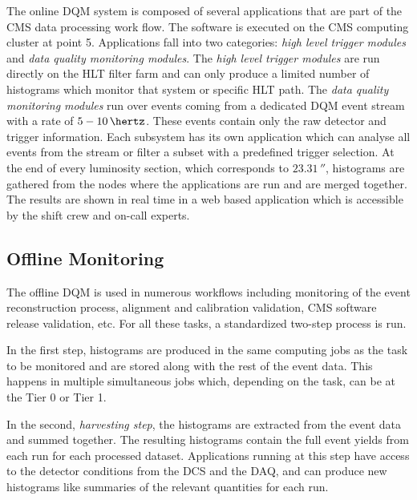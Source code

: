 
The online \gls{DQM} system is composed of several applications that are part of the \gls{CMS} data processing work flow. The software is executed on the \gls{CMS} computing cluster at point 5. Applications fall into two categories: \textit{high level trigger modules} and \textit{data quality monitoring modules}. The \textit{high level trigger modules} are run directly on the \gls{HLT} filter farm and can only produce a limited number of histograms which monitor that system or specific \gls{HLT} path. The \textit{data quality monitoring modules} run over events coming from a dedicated \gls{DQM} event stream with a rate of $5-10\,\hertz$. These events contain only the raw detector and trigger information. Each subsystem has its own application which can analyse all events from the stream or filter a subset with a predefined trigger selection. At the end of every luminosity section, which corresponds to $23.31\,\second$, histograms are gathered from the nodes where the applications are run and are merged together. The results are shown in real time in a web based application which is accessible by the shift crew and on-call experts.

\subsection{Offline Monitoring}
\label{SECTION:TechnicalWork_DataQualityMonitoring_OfflineMonitoring}


The offline \gls{DQM} is used in numerous workflows including monitoring of the event reconstruction process, alignment and calibration validation, \gls{CMS} software release validation, etc. For all these tasks, a standardized two-step process is run. 

In the first step, histograms are produced in the same computing jobs as the task to be monitored and are stored along with the rest of the event data. This happens in multiple simultaneous jobs which, depending on the task, can be at the Tier 0 or Tier 1.

In the second, \textit{harvesting step}, the histograms are extracted from the event data and summed together. The resulting histograms contain the full event yields from each run for each processed dataset. Applications running at this step have access to the detector conditions from the \gls{DCS} and the \gls{DAQ}, and can produce new histograms like summaries of the relevant quantities for each run.


